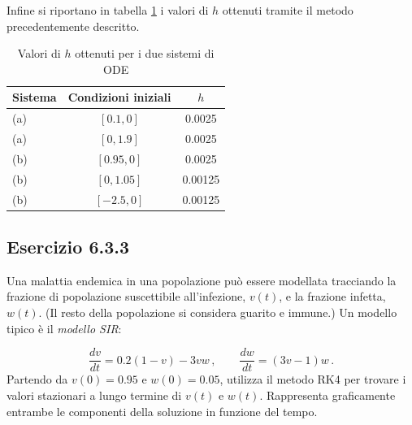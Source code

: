 \documentclass[letterpaper, 12pt]{article}
\numberwithin{equation}{section}    %
\begin{document}
Infine si riportano in tabella \ref{tab:valori_h} i valori di $h$ ottenuti tramite il metodo precedentemente descritto.
\begin{table}[!ht]
    \centering
    \caption{Valori di $h$ ottenuti per i due sistemi di ODE}
    \label{tab:valori_h}
    \begin{tabular}{|l|c|c|}
        \hline
        \textbf{Sistema} & \textbf{Condizioni iniziali} & \textbf{$h$} \\
        \hline
        (a) & $[0.1, 0]$ & 0.0025 \\
        (a) & $[0, 1.9]$ & 0.0025 \\
        (b) & $[0.95, 0]$ & 0.0025 \\
        (b) & $[0, 1.05]$ & 0.00125 \\
        (b) & $[-2.5, 0]$ & 0.00125 \\
        \hline
    \end{tabular}
\end{table}

\subsection{Esercizio 6.3.3}
Una malattia endemica in una popolazione può essere modellata tracciando la frazione di popolazione suscettibile 
all'infezione, $v(t)$, e la frazione infetta, $w(t)$. (Il resto della popolazione si considera guarito e immune.) 
Un modello tipico è il \textit{modello SIR}:

\begin{equation}
    \frac{dv}{dt} = 0.2(1-v) - 3vw\,, \qquad \frac{dw}{dt} = (3v-1)w\,.
\end{equation}
Partendo da $v(0) = 0.95$ e $w(0) = 0.05$, utilizza il metodo RK4 per trovare i valori stazionari a lungo termine 
di $v(t)$ e $w(t)$. Rappresenta graficamente entrambe le componenti della soluzione in funzione del tempo.
\end{document}
